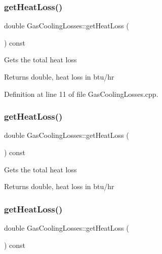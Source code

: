 \subsubsection{\texorpdfstring{get\+Heat\+Loss()}{getHeatLoss()}\hspace{0.1cm}{\footnotesize\ttfamily [1/3]}}
{\footnotesize\ttfamily double Gas\+Cooling\+Losses\+::get\+Heat\+Loss (\begin{DoxyParamCaption}{ }\end{DoxyParamCaption}) const}

Gets the total heat loss

\begin{DoxyReturn}{Returns}
double, heat loss in btu/hr 
\end{DoxyReturn}


Definition at line 11 of file Gas\+Cooling\+Losses.\+cpp.

\mbox{\label{class_gas_cooling_losses_a3c18b6d1ef3124d883daf85560ec7bd7}} 
\subsubsection{\texorpdfstring{get\+Heat\+Loss()}{getHeatLoss()}\hspace{0.1cm}{\footnotesize\ttfamily [2/3]}}
{\footnotesize\ttfamily double Gas\+Cooling\+Losses\+::get\+Heat\+Loss (\begin{DoxyParamCaption}{ }\end{DoxyParamCaption}) const}

Gets the total heat loss

\begin{DoxyReturn}{Returns}
double, heat loss in btu/hr 
\end{DoxyReturn}
\mbox{\label{class_gas_cooling_losses_a3c18b6d1ef3124d883daf85560ec7bd7}} 
\subsubsection{\texorpdfstring{get\+Heat\+Loss()}{getHeatLoss()}\hspace{0.1cm}{\footnotesize\ttfamily [3/3]}}
{\footnotesize\ttfamily double Gas\+Cooling\+Losses\+::get\+Heat\+Loss (\begin{DoxyParamCaption}{ }\end{DoxyParamCaption}) const}

